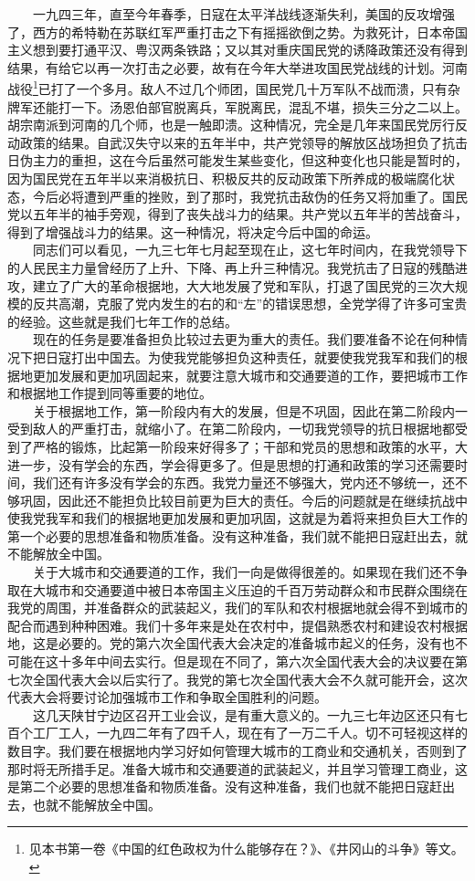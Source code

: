 \documentclass[cn,11pt,chinese]{elegantbook}
\begin{document}
　　一九四三年，直至今年春季，日寇在太平洋战线逐渐失利，美国的反攻增强了，西方的希特勒在苏联红军严重打击之下有摇摇欲倒之势。为救死计，日本帝国主义想到要打通平汉、粤汉两条铁路；又以其对重庆国民党的诱降政策还没有得到结果，有给它以再一次打击之必要，故有在今年大举进攻国民党战线的计划。河南战役\footnote[19]{ 见本书第一卷《中国的红色政权为什么能够存在？》、《井冈山的斗争》等文。}已打了一个多月。敌人不过几个师团，国民党几十万军队不战而溃，只有杂牌军还能打一下。汤恩伯部官脱离兵，军脱离民，混乱不堪，损失三分之二以上。胡宗南派到河南的几个师，也是一触即溃。这种情况，完全是几年来国民党厉行反动政策的结果。自武汉失守以来的五年半中，共产党领导的解放区战场担负了抗击日伪主力的重担，这在今后虽然可能发生某些变化，但这种变化也只能是暂时的，因为国民党在五年半以来消极抗日、积极反共的反动政策下所养成的极端腐化状态，今后必将遭到严重的挫败，到了那时，我党抗击敌伪的任务又将加重了。国民党以五年半的袖手旁观，得到了丧失战斗力的结果。共产党以五年半的苦战奋斗，得到了增强战斗力的结果。这一种情况，将决定今后中国的命运。\\
　　同志们可以看见，一九三七年七月起至现在止，这七年时间内，在我党领导下的人民民主力量曾经历了上升、下降、再上升三种情况。我党抗击了日寇的残酷进攻，建立了广大的革命根据地，大大地发展了党和军队，打退了国民党的三次大规模的反共高潮，克服了党内发生的右的和“左”的错误思想，全党学得了许多可宝贵的经验。这些就是我们七年工作的总结。\\
　　现在的任务是要准备担负比较过去更为重大的责任。我们要准备不论在何种情况下把日寇打出中国去。为使我党能够担负这种责任，就要使我党我军和我们的根据地更加发展和更加巩固起来，就要注意大城市和交通要道的工作，要把城市工作和根据地工作提到同等重要的地位。\\
　　关于根据地工作，第一阶段内有大的发展，但是不巩固，因此在第二阶段内一受到敌人的严重打击，就缩小了。在第二阶段内，一切我党领导的抗日根据地都受到了严格的锻炼，比起第一阶段来好得多了；干部和党员的思想和政策的水平，大进一步，没有学会的东西，学会得更多了。但是思想的打通和政策的学习还需要时间，我们还有许多没有学会的东西。我党力量还不够强大，党内还不够统一，还不够巩固，因此还不能担负比较目前更为巨大的责任。今后的问题就是在继续抗战中使我党我军和我们的根据地更加发展和更加巩固，这就是为着将来担负巨大工作的第一个必要的思想准备和物质准备。没有这种准备，我们就不能把日寇赶出去，就不能解放全中国。\\
　　关于大城市和交通要道的工作，我们一向是做得很差的。如果现在我们还不争取在大城市和交通要道中被日本帝国主义压迫的千百万劳动群众和市民群众围绕在我党的周围，并准备群众的武装起义，我们的军队和农村根据地就会得不到城市的配合而遇到种种困难。我们十多年来是处在农村中，提倡熟悉农村和建设农村根据地，这是必要的。党的第六次全国代表大会决定的准备城市起义的任务，没有也不可能在这十多年中间去实行。但是现在不同了，第六次全国代表大会的决议要在第七次全国代表大会以后实行了。我党的第七次全国代表大会不久就可能开会，这次代表大会将要讨论加强城市工作和争取全国胜利的问题。\\
　　这几天陕甘宁边区召开工业会议，是有重大意义的。一九三七年边区还只有七百个工厂工人，一九四二年有了四千人，现在有了一万二千人。切不可轻视这样的数目字。我们要在根据地内学习好如何管理大城市的工商业和交通机关，否则到了那时将无所措手足。准备大城市和交通要道的武装起义，并且学习管理工商业，这是第二个必要的思想准备和物质准备。没有这种准备，我们也就不能把日寇赶出去，也就不能解放全中国。\\
\end{document}
